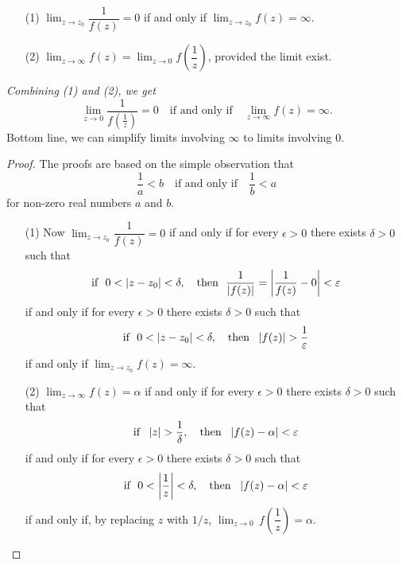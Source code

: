 \medskip

\begin{theorem}\hfill
\begin{itemize}
\item[(1)] $\displaystyle\lim_{z \to z_0} \dfrac{1}{f(z)} = 0$ if and only if $\displaystyle\lim_{z \to z_0}f(z) = \infty$.
\item[(2)] $\displaystyle\lim_{z \to \infty}f(z) = \lim_{z \to 0} f\left(\dfrac{1}{z}\right)$, provided the limit exist.
\end{itemize}
\emph{Combining (1) and (2), we get \[\displaystyle\lim_{z \to 0} \dfrac{1}{f\left(\frac{1}{z}\right)} = 0\quad \text{if and only if} \quad \displaystyle\lim_{z \to \infty}f(z) = \infty.\]}
Bottom line, we can simplify limits involving $\infty$ to limits involving $0$.
\end{theorem}
\begin{proof}
The proofs are based on the simple observation that
\[\frac{1}{a} < b \quad \text{if and only if} \quad \frac{1}{b} < a\]
for non-zero real numbers $a$ and $b$.
\begin{itemize}
\item[(1)] Now $\displaystyle\lim_{z \to z_0} \dfrac{1}{f(z)} = 0$ if and only if for every $\epsilon > 0$ there exists $\delta > 0$ such that 
\[\text{if }\ 0 < \left\lvert z - z_0\right\rvert < \delta,\quad \text{then }\ \frac{1}{\left\lvert f(z)\right\rvert} = \left\lvert\frac{1}{f(z)} - 0\right\rvert< \varepsilon\]
if and only if for every $\epsilon > 0$ there exists $\delta > 0$ such that 
\[\text{if }\ 0 < \abs{z - z_0} < \delta,\quad \text{then }\ \abs{f(z)}>\frac{1}{\epsilon}\]
if and only if
$\displaystyle\lim_{z \to z_0}f(z) = \infty$.
\item[(2)] $\displaystyle\lim_{z \to \infty}f(z) = \alpha$ if and only if for every $\epsilon > 0$ there exists $\delta > 0$ such that 
\[\text{if }\ \left\lvert z\right\rvert > \frac{1}{\delta},\quad \text{then }\ \left\lvert f(z) - \alpha\right\rvert< \varepsilon\]
if and only if for every $\epsilon > 0$ there exists $\delta > 0$ such that 
\[\text{if }\ 0 < \left\lvert\frac{1}{z}\right\rvert < \delta,\quad \text{then }\ \left\lvert f(z) - \alpha\right\rvert < \varepsilon\]
if and only if, by replacing $z$ with $1/z$, $\displaystyle\lim_{z \to 0}\,f\left(\dfrac{1}{z}\right) = \alpha$.
\end{itemize}
\end{proof}

\medskip

